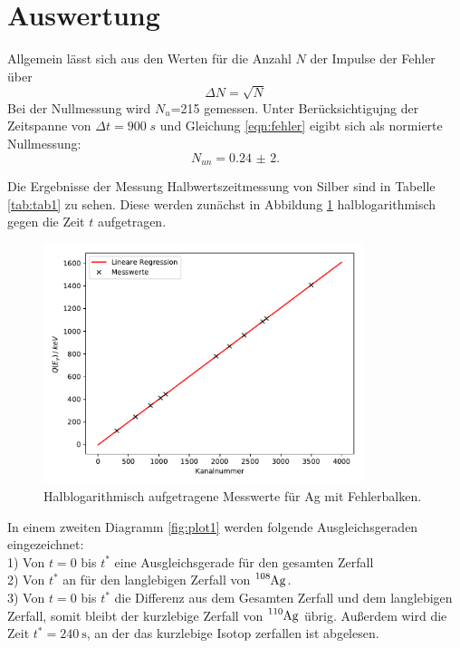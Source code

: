 \section{Auswertung}
\label{sec:Auswertung}
Allgemein lässt sich aus den Werten für die Anzahl $N$ der Impulse der Fehler
über
\begin{equation}
  \Delta N= \sqrt{N}
  \label{eqn:fehler}
\end{equation}
Bei der Nullmessung wird $N_u$=215 gemessen. Unter Berücksichtigujng der Zeitspanne von
$\Delta t=900\;s$ und Gleichung \ref{eqn:fehler} eigibt sich als normierte Nullmessung:
\begin{equation}
  N_{un}=\SI{0,24(2)}.
\end{equation}

Die Ergebnisse der Messung Halbwertszeitmessung von Silber sind in Tabelle
\ref{tab:tab1} zu sehen. Diese werden zunächst in Abbildung \ref{fig:plot3}
halblogarithmisch gegen die Zeit $t$ aufgetragen.



\begin{figure}[H]
  \centering
  \includegraphics[height=7cm]{plot3.pdf}
  \caption{Halblogarithmisch aufgetragene Messwerte für Ag mit Fehlerbalken.}
  \label{fig:plot3}
\end{figure}

In einem zweiten Diagramm \ref{fig:plot1} werden folgende Ausgleichsgeraden eingezeichnet:\\
1) Von $t=0$ bis $t^{*}$ eine Ausgleichsgerade für den gesamten Zerfall\\
2) Von $t^{*}$ an für den langlebigen Zerfall von $\ce{^{108}Ag}$. \\
3) Von $t=0$ bis $t^{*}$ die Differenz aus dem Gesamten Zerfall und dem langlebigen Zerfall, somit
bleibt der kurzlebige Zerfall von $\ce{^{110}Ag}$ übrig.
Außerdem wird die Zeit $t^{*}=\SI{240}{\s}$, an der das kurzlebige Isotop zerfallen ist abgelesen.

